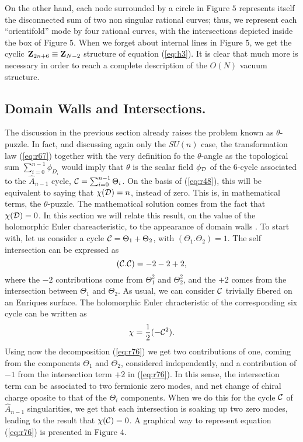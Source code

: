 

On the
other hand, each node surrounded by a circle in Figure $5$ represents
itself the disconnected sum of two non singular rational curves;
thus, we represent each ``orientifold'' mode by four rational
curves, with the intersections depicted inside the box of Figure
$5$. When we forget about internal lines in Figure $5$, we
get the cyclic ${\bf Z}_{2n+6} \equiv {\bf Z}_{N-2}$ structure of
equation (\ref{eq:h3}). It is clear that much more is necessary
in order to reach a complete description of the $O(N)$ vacuum
structure.


\subsection{Domain Walls and Intersections.}

The discussion in the previous section already raises the problem
known as $\theta$-puzzle. In fact, and discussing again only the
$SU(n)$ case, the transformation law (\ref{eq:r67}) together with the
very definition fo the $\theta$-angle as the topological sum
$\sum_{i=0}^{n-1} \phi_{D_i}$ would imply that $\theta$ is the
scalar field $\phi_{\cal D}$ of the $6$-cycle associated to the $\hat{A}_{n-1}$ cycle, ${\cal
C}= \sum_{i=0}^{n-1} \Theta_i$. On the basis of (\ref{eq:r48}),
this will be equivalent to saying that $\chi({\cal D})=n$,
instead of zero. This is, in mathematical terms, the
$\theta$-puzzle. The mathematical solution comes from the fact
that $\chi({\cal D})=0$. In this section we will relate this
result, on the value of the holomorphic Euler chareacteristic, to
the appearance of domain walls \cite{ds,kss,Smilga}. To start
with, let us consider a cycle ${\cal C} = \Theta_1 + \Theta_2$,
with $(\Theta_1 . \Theta_2)=1$. The self intersection can be
expressed as
\begin{equation}
({\cal C}. {\cal C})=-2-2+2,
\label{eq:r76}
\end{equation}
where the $-2$ contributions come from $\Theta_1^2$ and
$\Theta_2^2$, and the $+2$ comes from the intersection between
$\Theta_1$ and $\Theta_2$. As usual, we can consider ${\cal C}$ 
trivially fibered on an Enriques surface. The holomorphic Euler
chracteristic of the corresponding six cycle can be written as 
\begin{equation}
\chi = \frac {1}{2} (- {\cal C}^2).
\label{eq:h5}
\end{equation}
Using now the decomposition (\ref{eq:r76}) we get two
contributions of one, coming from the components $\Theta_1$ and
$\Theta_2$, considered independently, and a contribution of $-1$
from the intersection term $+2$ in (\ref{eq:r76}). In this sense,
the intersection term can be associated to two fermionic zero
modes, and net change of chiral charge oposite to that of the
$\Theta_i$ components. When we do this for the cycle ${\cal C}$
of $\hat{A}_{n-1}$ singularities, we get that each intersection
is soaking up two zero modes, leading to the result that
$\chi({\cal C})=0$. A graphical way to represent equation
(\ref{eq:r76}) is presented in Figure $4$.



